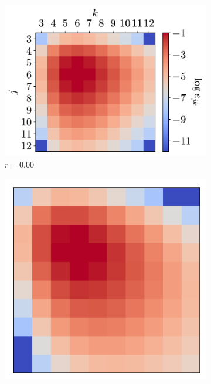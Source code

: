 \begin{figure}[bt]
        \begin{subfigure}[b]{0.32\textwidth}
         \centering
         \includegraphics[width=\textwidth]{./figures/general_networks/assort_mat_0.pdf}
         \caption{$r=0.00$}
         \label{fig:rexe}
     \end{subfigure}
     \hfill
     \begin{subfigure}[b]{0.205\textwidth}
         \centering
         \includegraphics[width=\textwidth]{./figures/general_networks/assort_mat_25.pdf}

\end{subfigure}
\end{figure}
